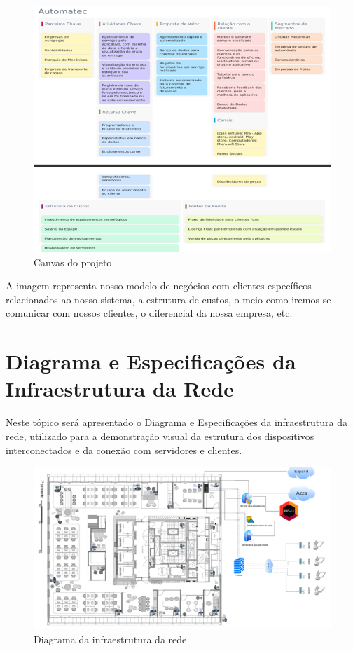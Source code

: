 \documentclass[
  a4paper,
  12pt,
  english,
  brazilian,
]{article}
\begin{document}
\begin{figure}[H]
\centering
\caption{Canvas do projeto}%
\label{fig:canvas}
\includegraphics[width=1.0\textwidth]{Logos/canvas.png}
\end{figure}

A imagem representa nosso modelo de negócios com clientes específicos relacionados ao nosso sistema, a estrutura de custos, o meio como iremos se comunicar com nossos clientes, o diferencial da nossa empresa, etc.

\section*{Diagrama e Especificações da Infraestrutura da Rede}

Neste tópico será apresentado o Diagrama e Especificações da infraestrutura da rede, utilizado para a demonstração visual da estrutura dos dispositivos interconectados e da conexão com servidores e clientes.

\begin{figure}[H]
\centering
\caption{Diagrama da infraestrutura da rede}%
\label{fig:infra-rede}
\includegraphics[width=1.0\textwidth]{Logos/infra_rede.png}
\end{figure}
\end{document}
